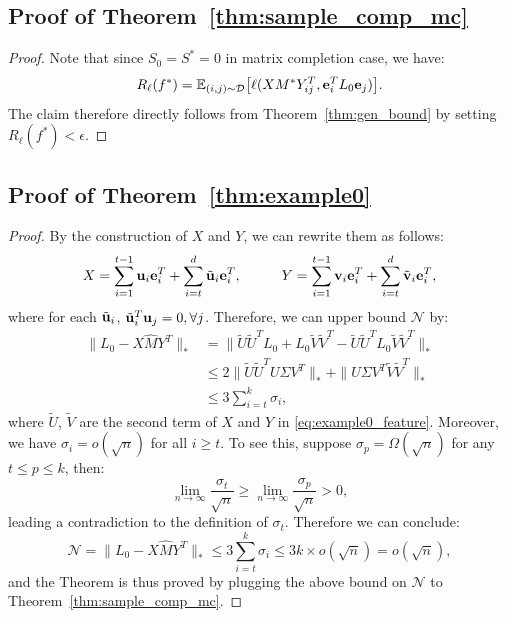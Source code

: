 \documentclass[twoside,11pt]{article}
\def\be{{\bf e}}
\def\bu{{\bf u}}
\def\bv{{\bf v}}
\def\dist{{\mathcal D}}
\newcommand\Ex[2]{{\mathbb E}_{#1}\big[#2\big]}
\def\nmax{{\mathcal N}}
\def\realL{L_0}
\def\realS{S_0}
\def\optM{M^*}
\def\optS{S^*}
\begin{document}
\subsection*{Proof of Theorem~\ref{thm:sample_comp_mc}}
\begin{proof}
  Note that since $\realS = \optS = 0$ in matrix completion case, we have:
  \begin{equation*}
    R_\ell(f^*) = \Ex{(i,j)\sim\dist}{\ell(X\optM Y^T_{ij}, \be_i^T\realL\be_j)}.
  \end{equation*}
  The claim therefore directly follows from Theorem~\ref{thm:gen_bound}
  by setting $R_\ell(f^*) < \epsilon$.
\end{proof}

\subsection*{Proof of Theorem~\ref{thm:example0}}
\begin{proof}
  By the construction of $X$ and $Y$, we can rewrite them as follows:
  \begin{align}
    X = \sum_{i=1}^{t-1}\bu_i\be_i^T + \sum_{i=t}^d\tilde{\bu}_i\be_i^T, \hspace{1cm}
    Y = \sum_{i=1}^{t-1}\bv_i\be_i^T + \sum_{i=t}^d\tilde{\bv}_i\be_i^T,
    \label{eq:example0_feature}
  \end{align}
  where for each $\tilde{\bu}_i$, $\tilde{\bu}_i^T\bu_j = 0,  \forall j$.  Therefore, we can upper
  bound $\nmax$ by:
  \begin{align*}
    \|\realL-X\hat{M}Y^T\|_* &= \|\tilde{U}\tilde{U}^T\realL + \realL\tilde{V}\tilde{V}^T - \tilde{U}\tilde{U}^T\realL\tilde{V}\tilde{V}^T\|_* \\
      &\leq 2\|\tilde{U}\tilde{U}^TU\Sigma V^T\|_* + \|U\Sigma V^T\tilde{V}\tilde{V}^T\|_* \\
      &\leq 3\sum_{i=t}^k \sigma_i,
  \end{align*}
  where $\tilde{U}$, $\tilde{V}$ are the second term of $X$ and $Y$ in \eqref{eq:example0_feature}.
  Moreover, we have $\sigma_i = o(\sqrt{n})$ for all $i \geq t$.
  To see this,
  suppose $\sigma_p = \Omega(\sqrt{n})$ for any $t \leq p \leq k $, then:
  \begin{equation*}
    \lim_{n\rightarrow\infty}\frac{\sigma_t}{\sqrt{n}} \geq
    \lim_{n\rightarrow \infty}\frac{\sigma_p}{\sqrt{n}} > 0,
  \end{equation*}
  leading a contradiction to the definition of $\sigma_t$.
  Therefore we can conclude:
  \begin{equation*}
    \nmax = \|\realL-X\hat{M}Y^T\|_* \leq 3\sum_{i=t}^k \sigma_i \leq 3k \times o(\sqrt{n}) = o(\sqrt{n}),
  \end{equation*}
  and the Theorem is thus proved by plugging the above bound on $\nmax$ to Theorem~\ref{thm:sample_comp_mc}.
\end{proof}
\end{document}
